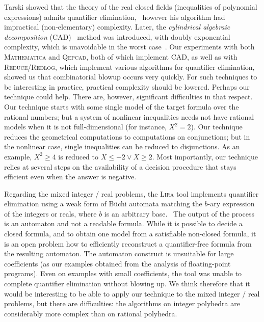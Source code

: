 Tarski showed that the theory of the real closed fields (inequalities of polynomial expressions) admits quantifier elimination,~\cite{Tarski51} however his algorithm had impractical (non-elementary) complexity. Later, the \emph{cylindrical algebraic decomposition} (CAD)~\cite[Ch.~11]{Basu_Pollack_Roy_2003} method was introduced, with doubly exponential complexity, which is unavoidable in the worst case~\cite[\S 11.4]{Basu_Pollack_Roy_2003}. Our experiments with both \textsc{Mathematica} and \textsc{Qepcad}, both of which implement CAD, as well as with \textsc{Reduce}/\textsc{Redlog}, which implement various algorithms for quantifier elimination, showed us that combinatorial blowup occurs very quickly. For such techniques to be interesting in practice, practical complexity should be lowered. Perhaps our technique could help. There are, however, significant difficulties in that respect. Our technique starts with some single model of the target formula over the rational numbers; but a system of nonlinear inequalities needs not have rational models when it is not full-dimensional (for instance, $X^2=2$). Our technique reduces the geometrical computations to computations on conjunctions; but in the nonlinear case, single inequalities can be reduced to disjunctions. As an example, $X^2 \geq 4$ is reduced to $X \leq -2 \vee X \geq 2$. Most importantly, our technique relies at several steps on the availability of a decision procedure that stays efficient even when the answer is negative.

Regarding the mixed integer / real problems, the \textsc{Lira} tool implements quantifier elimination using a weak form of B\"uchi automata matching the $b$-ary expression of the integers or reals, where $b$ is an arbitrary base.~\cite{Becker_et_al_CAV05} The output of the process  is an automaton and not a readable formula. While it is possible to decide a closed formula, and to obtain one model from a satisfiable non-closed formula, it is an open problem how to efficiently reconstruct a quantifier-free formula from the resulting automaton. The automaton construct is unsuitable for large coefficients (as our examples obtained from the analysis of floating-point programs). Even on examples with small coefficients, the tool was unable to complete quantifier elimination without blowing up. We think therefore that it would be interesting to be able to apply our technique to the mixed integer / real problems, but there are difficulties: the algorithms on integer polyhedra are considerably more complex than on rational polyhedra.

